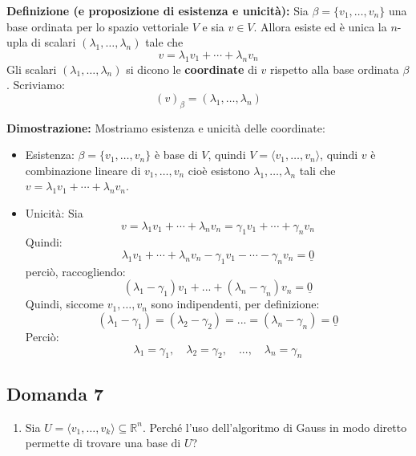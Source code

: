 \documentclass[
  a4paper,
]{article}
\providecommand{\tightlist}{%
  \setlength{\itemsep}{0pt}\setlength{\parskip}{0pt}}
\providecommand{\tightlist}{}
\begin{document}
\textbf{Definizione (e proposizione di esistenza e unicità):} Sia
\(\beta=\{v_1,\ldots,v_n\}\) una base ordinata per lo spazio vettoriale
\(V\) e sia \(v\in V\). Allora esiste ed è unica la \(n\)-upla di
scalari \((\lambda_1,\ldots,\lambda_n)\) tale che\\
\[  
v=\lambda_1 v_1+\cdots+\lambda_n v_n
\] Gli scalari \((\lambda_1,\ldots,\lambda_n)\) si dicono le
\textbf{coordinate} di \(v\) rispetto alla base ordinata \(\beta\).
Scriviamo: \[
(v)_{\beta} = (\lambda_1,\ldots,\lambda_n)
\]

\textbf{Dimostrazione:} Mostriamo esistenza e unicità delle coordinate:

\begin{itemize}
\item
  Esistenza: \(\beta=\{v_1,\ldots,v_n\}\) è base di \(V\), quindi
  \(V = \langle v_1 ,\dots ,v_n\rangle\), quindi \(v\) è combinazione
  lineare di \(v_1 ,\dots ,v_n\) cioè esistono
  \(\lambda_1,\ldots,\lambda_n\) tali che
  \(v=\lambda_1 v_1+\cdots+\lambda_n v_n\).
\item
  Unicità: Sia \[
  v=\lambda_1 v_1+\cdots+\lambda_n v_n = \gamma_1 v_1+\cdots+\gamma_n v_n
  \] Quindi: \[
  \lambda_1 v_1+\cdots+\lambda_n v_n - \gamma_1 v_1-\cdots-\gamma_n v_n = \underline{0}
  \] perciò, raccogliendo: \[
    (\lambda_1 - \gamma_1)v_1 + ... + (\lambda_n - \gamma_n)v_n = \underline{0}
   \] Quindi, siccome \(v_1,\ldots,v_n\) sono indipendenti, per
  definizione: \[
    (\lambda_1 - \gamma_1) = (\lambda_2 - \gamma_2) = ... = (\lambda_n - \gamma_n) = \underline{0}
   \] Perciò: \[
   \lambda_1 = \gamma_1, \quad \lambda_2 = \gamma_2, \quad ... , \quad \lambda_n = \gamma_n
   \]
\end{itemize}

\hypertarget{domanda-7}{%
\subsection{Domanda 7}\label{domanda-7}}

\begin{observationbox}[Domanda]
\begin{enumerate}
\def\labelenumi{\arabic{enumi}.}
\setcounter{enumi}{6}
\tightlist
\item
  Sia \(U=\langle v_1,\ldots,v_k\rangle\subseteq \mathbb{R}^n\). Perché
  l'uso dell'algoritmo di Gauss in modo diretto permette di trovare una
  base di \(U\)?
\end{enumerate}
\end{observationbox}
\end{document}
